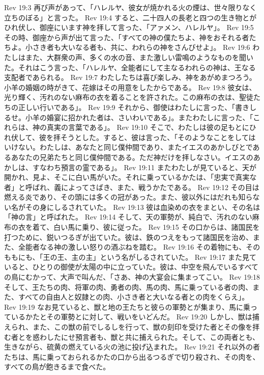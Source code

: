 Rev 19:3  再び声があって、「ハレルヤ、彼女が焼かれる火の煙は、世々限りなく立ちのぼる」と言った。
Rev 19:4  すると、二十四人の長老と四つの生き物とがひれ伏し、御座にいます神を拝して言った、「アァメン、ハレルヤ」。
Rev 19:5  その時、御座から声が出て言った、「すべての神の僕たちよ、神をおそれる者たちよ。小さき者も大いなる者も、共に、われらの神をさんびせよ」。
Rev 19:6  わたしはまた、大群衆の声、多くの水の音、また激しい雷鳴のようなものを聞いた。それはこう言った、「ハレルヤ、全能者にして主なるわれらの神は、王なる支配者であられる。
Rev 19:7  わたしたちは喜び楽しみ、神をあがめまつろう。小羊の婚姻の時がきて、花嫁はその用意をしたからである。
Rev 19:8  彼女は、光り輝く、汚れのない麻布の衣を着ることを許された。この麻布の衣は、聖徒たちの正しい行いである」。
Rev 19:9  それから、御使はわたしに言った、「書きしるせ。小羊の婚宴に招かれた者は、さいわいである」。またわたしに言った、「これらは、神の真実の言葉である」。
Rev 19:10  そこで、わたしは彼の足もとにひれ伏して、彼を拝そうとした。すると、彼は言った、「そのようなことをしてはいけない。わたしは、あなたと同じ僕仲間であり、またイエスのあかしびとであるあなたの兄弟たちと同じ僕仲間である。ただ神だけを拝しなさい。イエスのあかしは、すなわち預言の霊である」。
Rev 19:11  またわたしが見ていると、天が開かれ、見よ、そこに白い馬がいた。それに乗っているかたは、「忠実で真実な者」と呼ばれ、義によってさばき、また、戦うかたである。
Rev 19:12  その目は燃える炎であり、その頭には多くの冠があった。また、彼以外にはだれも知らない名がその身にしるされていた。
Rev 19:13  彼は血染めの衣をまとい、その名は「神の言」と呼ばれた。
Rev 19:14  そして、天の軍勢が、純白で、汚れのない麻布の衣を着て、白い馬に乗り、彼に従った。
Rev 19:15  その口からは、諸国民を打つために、鋭いつるぎが出ていた。彼は、鉄のつえをもって諸国民を治め、また、全能者なる神の激しい怒りの酒ぶねを踏む。
Rev 19:16  その着物にも、そのももにも、「王の王、主の主」という名がしるされていた。
Rev 19:17  また見ていると、ひとりの御使が太陽の中に立っていた。彼は、中空を飛んでいるすべての鳥にむかって、大声で叫んだ、「さあ、神の大宴会に集まってこい。
Rev 19:18  そして、王たちの肉、将軍の肉、勇者の肉、馬の肉、馬に乗っている者の肉、また、すべての自由人と奴隷との肉、小さき者と大いなる者との肉をくらえ」。
Rev 19:19  なお見ていると、獣と地の王たちと彼らの軍勢とが集まり、馬に乗っているかたとその軍勢とに対して、戦いをいどんだ。
Rev 19:20  しかし、獣は捕えられ、また、この獣の前でしるしを行って、獣の刻印を受けた者とその像を拝む者とを惑わしたにせ預言者も、獣と共に捕えられた。そして、この両者とも、生きながら、硫黄の燃えている火の池に投げ込まれた。
Rev 19:21  それ以外の者たちは、馬に乗っておられるかたの口から出るつるぎで切り殺され、その肉を、すべての鳥が飽きるまで食べた。
